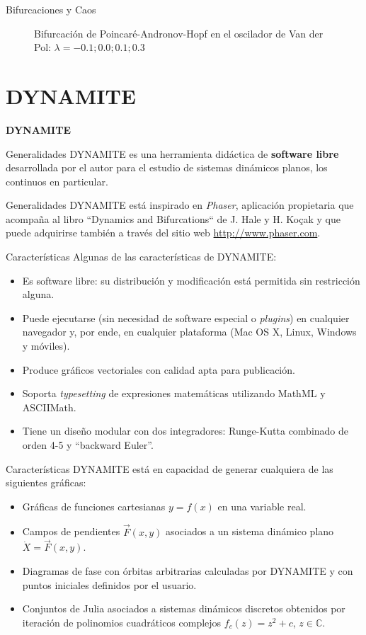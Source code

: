 \documentclass{beamer}
\newcommand{\C}{{\ensuremath{\mathbb{C}}}}
\newcommand{\stframe}[1]{\begin{frame} \begin{center}\Large{\textbf{{#1}}}\end{center}\end{frame}}
\begin{document}
\begin{frame}{Bifurcaciones y Caos}
\begin{figure}[!ht]
	\caption{Bifurcación de Poincaré-Andronov-Hopf en el oscilador de Van der Pol: $\lambda=-0.1;  0.0; 0.1; 0.3$}
\end{figure}
\end{frame}

\section{DYNAMITE}
\stframe{DYNAMITE}
\begin{frame}{Generalidades}
DYNAMITE es una herramienta didáctica de \textbf{software libre} desarrollada por el autor para el estudio de sistemas dinámicos planos, los continuos en particular.
\end{frame}

\begin{frame}{Generalidades}
DYNAMITE está inspirado en \textit{Phaser}, aplicación propietaria que acompaña al libro ``Dynamics and Bifurcations`` de J. Hale y H. Ko\c{c}ak y que puede adquirirse también a través del sitio web \url{http://www.phaser.com}.
\end{frame}

\begin{frame}{Características}
Algunas de las características de DYNAMITE:

	\begin{itemize}
		\item Es software libre: su distribución y modificación está permitida sin restricción alguna.
		\item Puede ejecutarse (sin necesidad de software especial o \textit{plugins}) en cualquier navegador y, por ende, en cualquier plataforma (Mac OS X, Linux, Windows y móviles).
		\item Produce gráficos vectoriales con calidad apta para publicación.
		\item Soporta \textit{typesetting} de expresiones matemáticas utilizando MathML y ASCIIMath.
		\item Tiene un diseño modular con dos integradores: Runge-Kutta combinado de orden 4-5 y ``backward Euler''.
	\end{itemize}
\end{frame}

\begin{frame}{Características}
	DYNAMITE está en capacidad de generar cualquiera de las siguientes gráficas:
	
	\begin{itemize}
		\item Gráficas de funciones cartesianas $y = f(x)$ en una variable real.
		\item Campos de pendientes $\vec{F}(x,y)$ asociados a un sistema dinámico plano $\dot{X} = \vec{F}(x,y)$.
		\item Diagramas de fase con órbitas arbitrarias calculadas por DYNAMITE y con puntos iniciales definidos por el usuario.
		\item Conjuntos de Julia asociados a sistemas dinámicos discretos obtenidos por iteración de polinomios cuadráticos complejos $f_c(z) = z^2 + c$, $z \in \C$.
	\end{itemize}
\end{frame}
\end{document}
